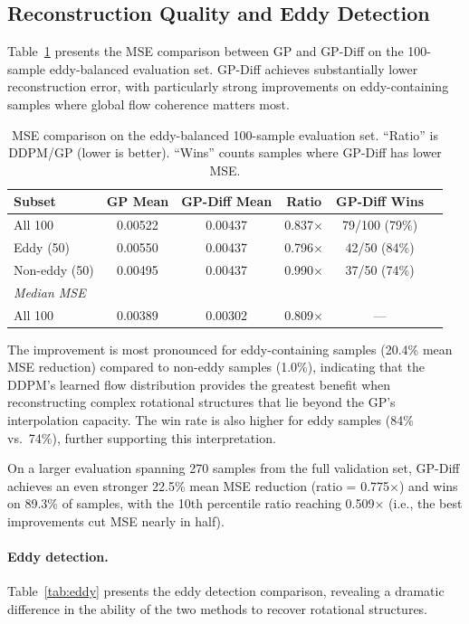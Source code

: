 \documentclass{article}
\begin{document}
\subsection{Reconstruction Quality and Eddy Detection}
\label{sec:main_results}

Table~\ref{tab:mse} presents the MSE comparison between GP and GP-Diff on the 100-sample eddy-balanced evaluation set. GP-Diff achieves substantially lower reconstruction error, with particularly strong improvements on eddy-containing samples where global flow coherence matters most.

\begin{table}[t]
\centering
\caption{MSE comparison on the eddy-balanced 100-sample evaluation set. ``Ratio'' is DDPM/GP (lower is better). ``Wins'' counts samples where GP-Diff has lower MSE.}
\label{tab:mse}
\begin{tabular}{lccccc}
\toprule
\textbf{Subset} & \textbf{GP Mean} & \textbf{GP-Diff Mean} & \textbf{Ratio} & \textbf{GP-Diff Wins} \\
\midrule
All 100 & 0.00522 & 0.00437 & 0.837$\times$ & 79/100 (79\%) \\
Eddy (50) & 0.00550 & 0.00437 & 0.796$\times$ & 42/50 (84\%) \\
Non-eddy (50) & 0.00495 & 0.00437 & 0.990$\times$ & 37/50 (74\%) \\
\midrule
\multicolumn{5}{l}{\textit{Median MSE}} \\
All 100 & 0.00389 & 0.00302 & 0.809$\times$ & --- \\
\bottomrule
\end{tabular}
\end{table}

The improvement is most pronounced for eddy-containing samples (20.4\% mean MSE reduction) compared to non-eddy samples (1.0\%), indicating that the DDPM's learned flow distribution provides the greatest benefit when reconstructing complex rotational structures that lie beyond the GP's interpolation capacity. The win rate is also higher for eddy samples (84\% vs.\ 74\%), further supporting this interpretation.

On a larger evaluation spanning 270 samples from the full validation set, GP-Diff achieves an even stronger 22.5\% mean MSE reduction (ratio = 0.775$\times$) and wins on 89.3\% of samples, with the 10th percentile ratio reaching 0.509$\times$ (i.e., the best improvements cut MSE nearly in half).

\paragraph{Eddy detection.}
Table~\ref{tab:eddy} presents the eddy detection comparison, revealing a dramatic difference in the ability of the two methods to recover rotational structures.
\end{document}
